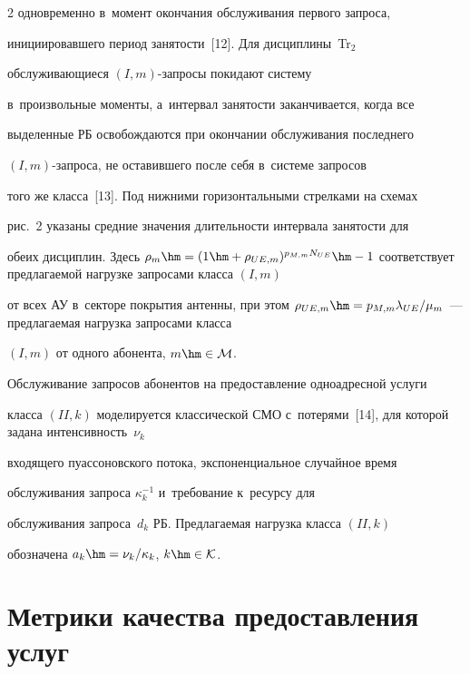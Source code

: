 \begin{multicols}{2}
одновременно в~момент окончания обслуживания первого запроса, 

ини\-ци\-иро\-вав\-ше\-го период за\-ня\-тости~[12]. Для дис\-цип\-лины~Tr$_2$ 

об\-слу\-жи\-ва\-ющи\-еся $({I}, m)$-за\-про\-сы покидают сис\-те\-му 

в~\mbox{произвольные} моменты, а~интервал за\-ня\-тости заканчивается, когда все 

выделенные РБ осво\-бож\-да\-ют\-ся при окончании обслуживания последнего 

$({I}, m)$-за\-про\-са, не оставившего после себя в~сис\-те\-ме запросов 

того же класса~[13]. Под ниж\-ни\-ми горизонтальными стрелками на схемах 

рис.~2 указаны сред\-ние значения дли\-тель\-ности интервала за\-ня\-тости для 

обеих дис\-цип\-лин. Здесь $\rho_m\hm= (1\hm+ \rho_{UE,m})^{p_{M,m}N_{UE}} 

\hm-1$ со\-от\-вет\-ст\-ву\-ет пред\-ла\-га\-емой нагрузке запросами класса $({I}, m)$ 

от всех АУ в~секторе покрытия антенны, при этом $\rho_{UE,m}\hm= p_{M,m} 

\lambda_{UE}/\mu_m$~--- пред\-ла\-га\-емая на\-груз\-ка запросами класса 

$({I}, m)$ от одного абонента, $m\hm\in \mathcal{M}$.





  Обслуживание запросов абонентов на предо\-став\-ле\-ние одноадресной услуги 

класса $({II}, k)$ моделируется классической СМО с~потерями~[14], для которой задана ин\-тен\-сив\-ность~$\nu_k$ 

входящего пуассоновского потока, экспоненциальное случайное время 

обслуживания запроса $\kappa_k^{-1}$ и~требование к~ресурсу для 

обслуживания запроса~$d_k$ РБ. Пред\-ла\-га\-емая на\-груз\-ка класса $({II}, k)$ 

обозначена $a_k\hm= \nu_k/\kappa_k$, $k\hm\in \mathcal{K}$.

  

\section{Метрики качества предоставления услуг}




\end{multicols}
